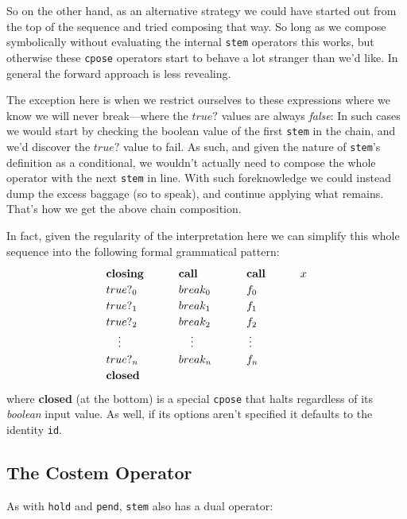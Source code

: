 \documentclass[twoside]{article}
\newcommand{\strong}[1]{{\bfseries #1}}
\newcommand{\bfmbox}[1]{\mbox{\bfseries #1}}
\newcommand{\tab}[1][1.125cm]{\hspace{#1}}
\newcommand{\col}[1][0ex]{& \hspace{#1}}
\begin{document}
So on the other hand, as an alternative strategy we could have started out from the top of the sequence and tried composing
that way. So long as we compose symbolically without evaluating the internal \texttt{stem} operators this works, but otherwise
these \texttt{cpose} operators start to behave a lot stranger than we'd like. In general the forward approach is less revealing.

The exception here is when we restrict ourselves to these expressions where we know we will never break---where the $ true? $
values are always \emph{false}: In such cases we would start by checking the boolean value of the first \texttt{stem} in the
chain, and we'd discover the $ true? $ value to fail. As such, and given the nature of \texttt{stem}'s definition as a
conditional, we wouldn't actually need to compose the whole operator with the next \texttt{stem} in line. With such
foreknowledge we could instead dump the excess baggage (so to speak), and continue applying what remains. That's
how we get the above chain composition.

In fact, given the regularity of the interpretation here we can simplify this whole sequence into the following
formal grammatical pattern:
$$ \def\arraystretch{1.2}
\begin{array}{llll}
\bfmbox{closing}	\col[5ex] \bfmbox{call}		\col[5ex] \bfmbox{call}	\col[5ex] x	\\
true?_0			\col[5ex] break_0		\col[5ex] f_0				\\
true?_1			\col[5ex] break_1		\col[5ex] f_1				\\
true?_2			\col[5ex] break_2		\col[5ex] f_2				\\

\tab[2.5ex] \vdots	\col[7.5ex] \vdots		\col[5.5ex] \vdots			\\

true?_n			\col[5ex] break_n		\col[5ex] f_n				\\
\bfmbox{closed}
\end{array} $$
where \strong{closed} (at the bottom) is a special \texttt{cpose} that halts regardless of its \emph{boolean} input value.
As well, if its options aren't specified it defaults to the identity \texttt{id}.

\subsection*{The Costem Operator}

As with \texttt{hold} and \texttt{pend}, \texttt{stem} also has a dual operator:
\ \\
\end{document}
